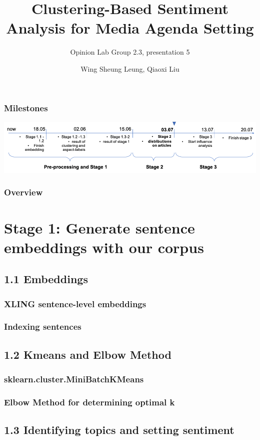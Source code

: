 \documentclass{tum-presentation}
\title[Shortened Title]{Clustering-Based Sentiment Analysis for Media Agenda Setting}
\subtitle{Opinion Lab Group 2.3, presentation 5}
\author{Wing Sheung Leung, Qiaoxi Liu}
\begin{document}
\begin{frame}[noframenumbering]
  \titlepage
\end{frame}
\begin{frame}
  \frametitle{Milestones}
  \vspace{2cm}
 \includegraphics[width = \textwidth]{figures/timeline.pdf}
  
\end{frame}
\begin{frame}[t]
  \frametitle{Overview}
  \tableofcontents[sectionstyle=show,subsectionstyle=show,subsubsectionstyle=shaded]
\end{frame}



\section{Stage 1: Generate sentence embeddings with our corpus}
\subsection{1.1 Embeddings}
\subsubsection{XLING sentence-level embeddings}

\subsubsection{Indexing sentences}
\subsection{1.2 Kmeans and Elbow Method}
\subsubsection{sklearn.cluster.MiniBatchKMeans}
\subsubsection{Elbow Method for determining optimal k}

\subsection{1.3 Identifying topics and setting sentiment}
\end{document}
